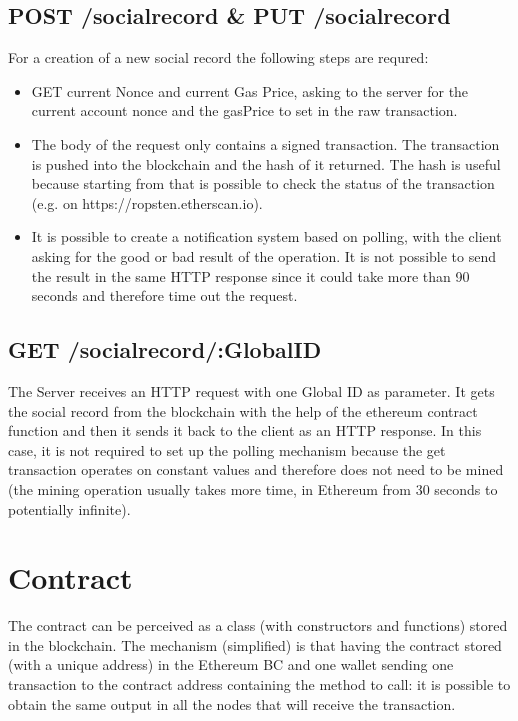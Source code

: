 \subsection{POST /socialrecord \& PUT /socialrecord}
  For a creation of a new social record the following steps are requred:
  \begin{itemize}
    \item GET current Nonce and current Gas Price, asking to the server for the current account nonce and the gasPrice to set in the raw transaction.
    \item The body of the request only contains a signed transaction. The transaction is pushed into the blockchain and the hash of it returned. The hash is useful because starting from that is possible to check the status of the transaction (e.g. on https://ropsten.etherscan.io).
    \item It is possible to create a notification system based on polling, with the client asking for the good or bad result of the operation. It is not possible to send the result in the same HTTP response since it could take more than 90 seconds and therefore time out the request.
  \end{itemize}

\subsection{GET /socialrecord/:GlobalID}
The Server receives an HTTP request with one Global ID as parameter. It gets the social record from the blockchain with the help of the ethereum contract function and then it sends it back to the client as an HTTP response.
In this case, it is not required to set up the polling mechanism because the get transaction operates on constant values and therefore does not need to be mined (the mining operation usually takes more time, in Ethereum from 30 seconds to potentially infinite).

\section{Contract}
The contract can be perceived as a class (with constructors and functions) stored in the blockchain.
The mechanism (simplified) is that having the contract stored (with a unique address) in the Ethereum BC and one wallet sending one transaction to the contract address containing the method to call: it is possible to obtain the same output in all the nodes that will receive the transaction.

